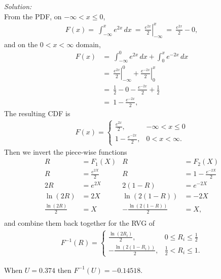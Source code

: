 \documentclass[12pt]{amsart}
\begin{document}
\bigskip
	\textit{Solution:} \\
	From the PDF, on \(-\infty<x\leq0\),
	\begin{align*}
		F(x)	=\ 	\int_{-\infty}^{x} e^{2x}\, dx  \
			 =\		\left.\frac{e^{2x}}{2} \right|_{-\infty}^x \
			 =\		\frac{e^{2x}}{2} - 0,
	\end{align*}
	and on the \(0<x<\infty\) domain,
	\begin{align*}
		F(x)&=\  \int_{-\infty}^{0} e^{2x}\, dx + \int_{0}^{x} e^{-2x}\, dx \\
		&=\  \left.\frac{e^{2x}}{2} \right|_{-\infty}^0 + \left.\frac{e^{-2x}}{2} \right|_{0}^x \\
		&=\  \frac{1}{2} - 0 - \frac{e^{-2x}}{2} + \frac{1}{2} \\
		&=\  1 - \frac{e^{-2x}}{2},
	\end{align*}
	The resulting CDF is 
	\begin{align*}
	F(x)= \begin{cases}
		\frac{e^{2x}}{2}, & -\infty<x\leq0 \\
		1- \frac{e^{-2x}}{2}, & 0<x<\infty.
	\end{cases}
	\end{align*}
	Then we invert the piece-wise functions
	\begin{align*}
		R &= F_1(X) & R &= F_2(X) \\
		R &= \frac{e^{2X}}{2} & R &= 1-\frac{e^{-2X}}{2} \\
		2R &= e^{2X} & 2(1-R) &= e^{-2X} \\
		\ln (2R) &= 2X & \ln (2(1-R)) &= -2X \\
		\frac{\ln (2R)}{2} &= X & -\frac{\ln(2(1-R))}{2} &= X, \\
	\end{align*}
	and combine them back together for the RVG of
		\begin{align*}
		F^{-1}(R)= \begin{cases}
			\frac{\ln (2R_i)}{2}, & 0\leq R_i \leq \frac{1}{2} \\
			-\frac{\ln(2(1-R_i))}{2}, & \frac{1}{2}<R_i\leq1.
		\end{cases}
	\end{align*}

	When \(U=0.374\) then \(F^{-1}(U)=-0.14518\).
\end{document}
